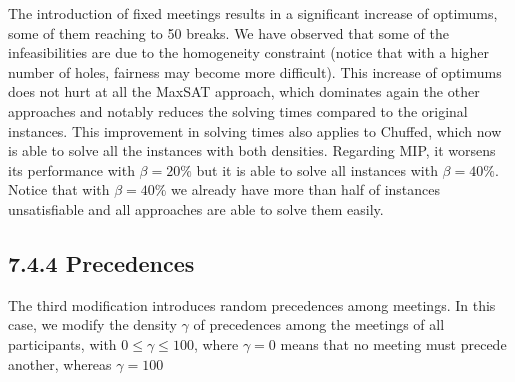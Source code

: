 \documentclass[10pt]{article}
\begin{document}
The introduction of fixed meetings results in a significant increase of optimums, some of them reaching to 50 breaks. We have observed that some of the infeasibilities are due to the homogeneity constraint (notice that with a higher number of holes, fairness may become more difficult). This increase of optimums does not hurt at all the MaxSAT approach, which dominates again the other approaches and notably reduces the solving times compared to the original instances. This improvement in solving times also applies to Chuffed, which now is able to solve all the instances with both densities. Regarding MIP, it worsens its performance with $\beta=20 \%$ but it is able to solve all instances with $\beta=40 \%$. Notice that with $\beta=40 \%$ we already have more than half of instances unsatisfiable and all approaches are able to solve them easily.

\subsection*{7.4.4 Precedences}
The third modification introduces random precedences among meetings. In this case, we modify the density $\gamma$ of precedences among the meetings of all participants, with $0 \leq \gamma \leq 100$, where $\gamma=0$ means that no meeting must precede another, whereas $\gamma=100$
\end{document}
